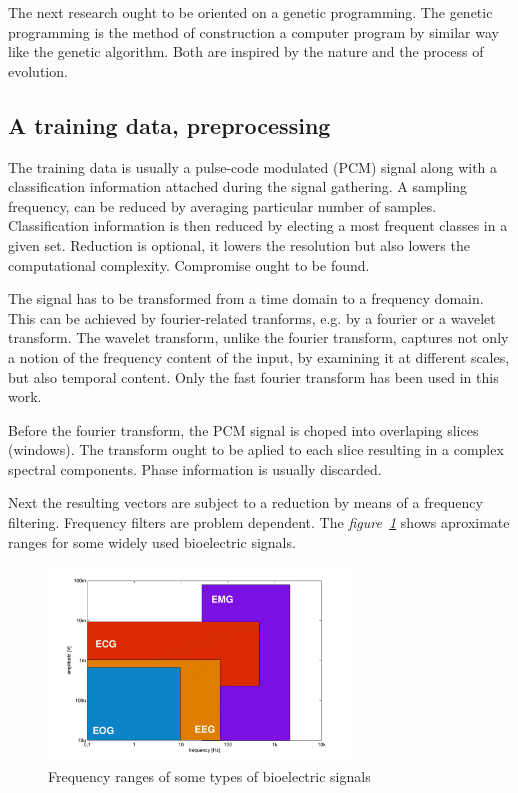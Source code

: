\documentclass[a4paper]{IEEEtran}
\begin{document}
The next research ought to be oriented on a genetic programming. The genetic programming 
is the method of construction a computer program by similar way like the genetic
algorithm. Both are inspired by the nature and the process of evolution.


\subsection{A training data, preprocessing}
The training data is usually a pulse-code modulated (PCM) signal \cite{pcm} along with a
classification information attached during the signal gathering.
A sampling frequency, can be reduced by averaging particular number of samples. Classification
information is then reduced by electing a most frequent classes in a given set.
Reduction is optional, it lowers the resolution but also lowers the
computational complexity. Compromise ought to be found.

The signal has to be transformed
from a time domain to a frequency domain.
This can be achieved by fourier-related tranforms, e.g. by a fourier\cite{fourier} or
a wavelet\cite{wavelet} transform.
The wavelet transform, unlike the fourier transform, captures not only a notion of the 
frequency content of the input, by examining it at different scales, but also temporal content.
Only the fast fourier transform has been used in this work.

Before the fourier transform, the PCM signal is choped into overlaping slices (windows).
The transform ought to be aplied to each slice resulting in a complex spectral components.
Phase information is usually discarded.

Next the resulting vectors are subject to a reduction by means of a
frequency filtering. Frequency filters are problem dependent.
The \textit{figure~\ref{fig:filters2}} shows aproximate ranges for some widely used bioelectric signals.
\begin{figure}[h]
	\centering
	\includegraphics[width=80mm]{filters2}
	\caption{Frequency ranges of some types of bioelectric signals}
	\label{fig:filters2}
\end{figure}
\end{document}
